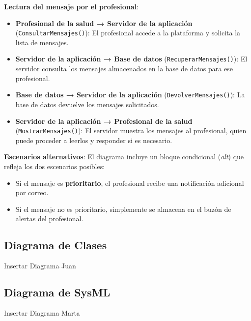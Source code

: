 \documentclass{article}
\begin{document}
\textbf{Lectura del mensaje por el profesional}:
\begin{itemize}
	\item \textbf{Profesional de la salud → Servidor de la aplicación} (\texttt{ConsultarMensajes()}): El profesional accede a la plataforma y solicita la lista de mensajes.
	\item \textbf{Servidor de la aplicación → Base de datos} (\texttt{RecuperarMensajes()}): El servidor consulta los mensajes almacenados en la base de datos para ese profesional.
	\item \textbf{Base de datos → Servidor de la aplicación} (\texttt{DevolverMensajes()}): La base de datos devuelve los mensajes solicitados.
	\item \textbf{Servidor de la aplicación → Profesional de la salud} (\texttt{MostrarMensajes()}): El servidor muestra los mensajes al profesional, quien puede proceder a leerlos y responder si es necesario.
\end{itemize}

\textbf{Escenarios alternativos}:
El diagrama incluye un bloque condicional (\textit{alt}) que refleja los dos escenarios posibles:
\begin{itemize}
	\item Si el mensaje es \textbf{prioritario}, el profesional recibe una notificación adicional por correo.
	\item Si el mensaje no es prioritario, simplemente se almacena en el buzón de alertas del profesional.
\end{itemize}




\subsection{Diagrama de Clases}

Insertar Diagrama Juan

\subsection{Diagrama de SysML}

Insertar Diagrama Marta
\end{document}
